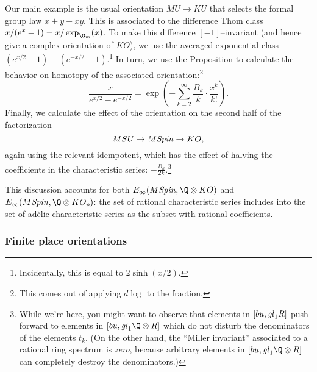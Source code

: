 Our main example is the usual orientation $MU \to KU$ that selects the formal group law $x + y - xy$.  This is associated to the difference Thom class $x / (e^x - 1) = x / \exp_{\G_m}(x)$.  To make this difference $[-1]$--invariant (and hence give a complex-orientation of $KO$), we use the averaged exponential class $(e^{x/2} - 1) - (e^{-x/2} - 1)$.\footnote{Incidentally, this is equal to $2\operatorname{sinh}(x/2)$.}  In turn, we use the Proposition to calculate the behavior on homotopy of the associated orientation:\footnote{This comes out of applying $d\log$ to the fraction.} \[\frac{x}{e^{x/2} - e^{-x/2}} = \exp\left(-\sum_{k=2}^\infty \frac{B_k}{k} \cdot \frac{x^k}{k!}\right).\]  Finally, we calculate the effect of the orientation on the second half of the factorization \[MSU \to M\mathit{Spin} \to KO,\] again using the relevant idempotent, which has the effect of halving the coefficients in the characteristic series: $-\frac{B_k}{2k}$.\footnote{While we're here, you might want to observe that elements in $[bu, \mathit{gl}_1 R]$ push forward to elements in $[bu, \gl_1 \Q \otimes R]$ which do not disturb the denominators of the elements $t_k$.  (On the other hand, the ``Miller invariant'' associated to a rational ring spectrum is \emph{zero}, because arbitrary elements in $[bu, \gl_1 \Q \otimes R]$ can completely destroy the denominators.)}

This discussion accounts for both $E_\infty(M\Spin, \Q \otimes KO)$ and $E_\infty(M\Spin, \Q \otimes KO_p)$: the set of rational characteristic series includes into the set of ad\`elic characteristic series as the subset with rational coefficients.




\subsubsection{Finite place orientations}\label{FinitePlaceOrientationsSubsection}
\newcommand{\spin}{\mathit{spin}}

